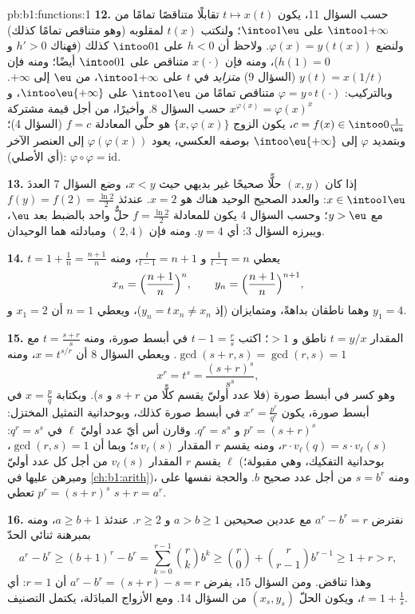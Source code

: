 \begin{solution}{pb:b1:functions:1}
\textbf{12.} حسب السؤال 11، يكون $t \mapsto x(t)$ تقابلًا متناقصًا
تمامًا من $\intoo1{+\infty}$ على $\intoo1\eu$؛
ولنكتب $t(x)$ لمقلوبه (وهو متناقص تمامًا كذلك) ولنضع
$\varphi(x) = y(t(x))$. ولاحظ أن $h < 0$ على $\intoo01$ كذلك (فهناك
$h' > 0$ و $h(1) = 0$)، ومنه فإن $x(\cdot)$ متناقص على
$\intoo01$ أيضًا؛ ومنه فإن $y(t) = x(1/t)$ (السؤال 9)
\emph{متزايد} في $t$ على $\intoo1{+\infty}$، من $\eu$ إلى
$+\infty$. وبالتركيب: $\varphi = y \circ t(\cdot)$ متناقص
تمامًا من $\intoo1\eu$ على $\intoo\eu{+\infty}$، و
$x^{\varphi(x)} = \varphi(x)^x$ حسب السؤال 8. وأخيرًا، من أجل قيمة
مشتركة $c = f(x) \in \intoo0{\frac1\eu}$، يكون الزوج $\{x,
\varphi(x)\}$ هو  حلّي المعادلة $f = c$
(السؤال 4)؛ وبتمديد $\varphi$ إلى $\intoo\eu{+\infty}$ بوصفه
 العكسي، يعود $\varphi(\varphi(x))$ إلى العنصر الآخر (أي
الأصلي): $\varphi \circ \varphi = \mathrm{id}$.

\textbf{13.} إذا كان $(x, y)$ حلًّا صحيحًا غير بديهي حيث $x
< y$، وضع السؤال 7 العددَ $x \in \intoo1\eu$: والعدد الصحيح الوحيد هناك
هو $x = 2$. عندئذ $f(y) = f(2) = \frac{\ln2}2$ مع $y > \eu$؛ وحسب
السؤال 4 يكون للمعادلة $f = \frac{\ln2}2$ حلٌّ واحد بالضبط
بعد $\eu$، ويبرزه السؤال 3: أي $y = 4$. ومنه فإن
$(2, 4)$ ومبادلته هما الوحيدان.

\textbf{14.} $t = 1 + \frac1n = \frac{n+1}n$ يعطي $\frac1{t - 1}
= n$ و $\frac t{t-1} = n + 1$، ومنه
\[
x_n = \Bigl(\frac{n+1}n\Bigr)^{n},
\qquad
y_n = \Bigl(\frac{n+1}n\Bigr)^{n+1},
\]
وهما ناطقان بداهةً، ومتمايزان (إذ $y_n = t\,x_n \neq x_n$)، ويعطي $n =
1$ أن $x_1 = 2$ و $y_1 = 4$.

\textbf{15.} المقدار $t = y/x$ ناطق و $> 1$؛ اكتب $t - 1 =
\frac rs$ في أبسط صورة، ومنه $t = \frac{s + r}s$ مع $\gcd(s +
r, s) = \gcd(r, s) = 1$. ويعطي السؤال 8 أن $x = t^{s/r}$، ومنه
\[
x^r = t^s = \frac{(s+r)^s}{s^s} ,
\]
وهو كسر في أبسط صورة (فلا عدد أوليّ يقسم كلًّا من $s + r$ و
$s$). وبكتابة $x = \frac pq$ في أبسط صورة، يكون $x^r = \frac{p^r}
{q^r}$ في أبسط صورة كذلك، وبوحدانية التمثيل
المختزل: $p^r = (s+r)^s$ و $q^r = s^s$. وقارن
أس أيّ عدد أوليّ $\ell$ في $q^r = s^s$: $r \cdot
v_\ell(q) = s \cdot v_\ell(s)$، ومنه يقسم $r$ المقدار $s\,v_\ell(s)$؛
وبما أن $\gcd(r, s) = 1$، يقسم $r$ المقدار $v_\ell(s)$ من أجل كل عدد أوليّ
$\ell$ (بوحدانية التفكيك، وهي مقبولة؛ ومبرهن عليها في
\cref{ch:b1:arith})، ومنه $s = b^r$ من أجل عدد صحيح $b$. والحجة
نفسها على $p^r = (s+r)^s$ تعطي $s + r = a^r$.

\textbf{16.} نفترض $a^r - b^r = r$ مع عددين صحيحين $a > b \geq 1$
و $r \geq 2$. عندئذ $a \geq b + 1$، ومنه بمبرهنة ثنائي الحدّ
\[
a^r - b^r \geq (b+1)^r - b^r
= \sum_{k=0}^{r-1}\binom rk b^k
\geq \binom r0 + \binom r{r-1} b^{r-1}
\geq 1 + r > r ,
\]
وهذا تناقض. ومن السؤال 15، يفرض $a^r - b^r = (s + r) - s = r$
أن $r = 1$: أي $t = 1 + \frac1s$، ويكون الحلّ $(x_s,
y_s)$ من السؤال 14. ومع الأزواج المبادَلة، يكتمل
التصنيف.


\end{solution}

